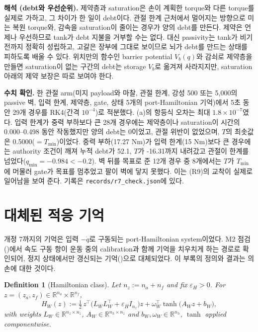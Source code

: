 \documentclass[11pt]{article}\usepackage[margin=1in]{geometry}\usepackage{amsmath,amssymb,amsthm,mathtools}\usepackage{graphicx}\graphicspath{{figures/}{../figures/}{figs/}{./}}\usepackage{enumitem}\usepackage{hyperref}\usepackage{cleveref}\usepackage{tikz}\usetikzlibrary{arrows.meta,positioning,calc,shapes.geometric}\usepackage{float}\usepackage{rotating}\usepackage[most]{tcolorbox}\usepackage{kotex}\usepackage{booktabs}\usepackage{longtable}\emergencystretch=1.6em\tolerance=2000 \crefname{assumption}{Assumption}{Assumptions}\Crefname{assumption}{Assumption}{Assumptions}\crefname{definition}{Definition}{Definitions}\Crefname{definition}{Definition}{Definitions}\crefname{proposition}{Proposition}{Propositions}\Crefname{proposition}{Proposition}{Propositions}\crefname{fact}{Fact}{Facts}\Crefname{fact}{Fact}{Facts} \newtheorem{assumption}{Assumption}\newtheorem{definition}{Definition}\newtheorem{lemma}{Lemma}\newtheorem{proposition}{Proposition}\newtheorem{theorem}{Theorem}\newtheorem{corollary}{Corollary}\newtheorem{fact}{Fact}\theoremstyle{remark}\newtheorem{remark}{Remark} \newcommand{\R}{\mathbb{R}}\newcommand{\xb}{\bar x}\newcommand{\Ab}{\bar A}\newcommand{\By}{\bar B_y}\newcommand{\U}{\mathcal U}\newcommand{\Z}{\mathcal Z}
\begin{document}
\textbf{해석 (debt와 우선순위).} 제약층과 saturation은 손이 계획한 torque와 다른 torque를 실제로 가하고, 그 차이가 한 일이 debt이다. 관절 한계 근처에서 멀어지는 방향으로 미는 복원 torque와, 감속을 saturation이 줄이는 경우가 양의 debt를 만든다. 제약은 언제나 우선하므로 tank가 debt 지불을 거부할 수는 없다. 대신 passivity는 tank가 비기 전까지 정확히 성립하고, 고갈은 장부에 그대로 보이므로 뇌가 debt를 만드는 상태를 피하도록 배울 수 있다. 위치만의 함수인 barrier potential $V_b(q)$와 감쇠로 제약층을 만들면 saturation이 없는 구간의 debt는 storage $V_b$로 옮겨져 사라지지만, saturation 아래의 제약 보장은 따로 보여야 한다.

\textbf{수치 확인.} 한 관절 arm(미지 payload와 마찰, 관절 한계, 강성 500 또는 5{,}000의 passive 벽, 입력 한계, 제약층, gate, 상태 5개의 port-Hamiltonian 기억)에서 5초 동안 29개 경우를 RK4(간격 $10^{-4}$)로 적분했다. (a)의 항등식 오차는 최대 $1.8\times10^{-7}$였다. 입력 한계가 중력 부하보다 큰 28개 경우에는 제약층이나 saturation이 시간의 0.000--0.498 동안 작동했지만 양의 debt는 0이었고, 관절 위반이 없었으며, $T$의 최솟값은 0.5000($=T_{\min}$)이었다. 중력 부하(17.27 Nm)가 입력 한계(15 Nm)보다 큰 경우에는 authority 조건이 깨져 누적 debt가 52.1, $T$가 -16.31까지 내려갔고 관절이 한계를 넘었다($q_{\min}=-0.984<-0.2$). 벽 뒤를 목표로 준 12개 경우 중 8개에서는 $T$가 $T_{\min}$에 머물러 gate가 목표를 멈추었고 팔이 벽에 닿지 못했다. 이는 (R9)의 교착이 실제로 일어남을 보여 준다. 기록은 \texttt{records/r7\_check.json}에 있다.


\section{대체된 적응 기억}
\label{app:oldmem}

개정 7까지의 기억은 입력 $-\dot q$로 구동되는 port-Hamiltonian system이었다. M2 점검()에서 속도 구동 항이 운동 중의 calibration과 함께 기억을 치우치게 하는 경로로 확인되어, 정지 상태에서만 갱신되는 기억()으로 대체되었다. 이 부록의 정의와 결과는 의 손에 대한 것이다.

\begin{definition}[Hamiltonian class]
\label{def:hclass}
Let $n_z:=n_a+n_f$ and fix $\varepsilon_H>0$. For $z=(z_a,z_f)\in\R^{n_a}\times\R^{n_f}$,
\[
H_W(z):=\tfrac12\,z^\top\big(L_WL_W^\top+\varepsilon_HI_{n_z}\big)z+\omega_W^\top\tanh\big(A_Wz+b_W\big),
\]
with weights $L_W\in\R^{n_z\times n_z}$, $A_W\in\R^{n_h\times n_z}$ and $b_W,\omega_W\in\R^{n_h}$, $\tanh$ applied componentwise.
\end{definition}
\end{document}
